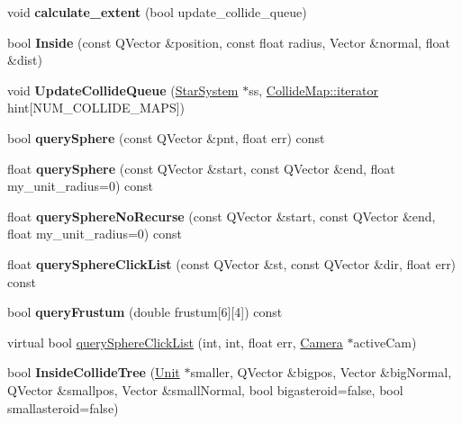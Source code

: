 \begin{DoxyCompactItemize}
\item 
void {\bfseries calculate\+\_\+extent} (bool update\+\_\+collide\+\_\+queue)\hypertarget{classUnit_ac7d13a538a0e97da9ec3c8e6926fdbcd}{}\label{classUnit_ac7d13a538a0e97da9ec3c8e6926fdbcd}

\item 
bool {\bfseries Inside} (const Q\+Vector \&position, const float radius, Vector \&normal, float \&dist)\hypertarget{classUnit_a30cc84a796e23fb5b35604edaa029533}{}\label{classUnit_a30cc84a796e23fb5b35604edaa029533}

\item 
void {\bfseries Update\+Collide\+Queue} (\hyperlink{classStarSystem}{Star\+System} $\ast$ss, \hyperlink{classCollidable}{Collide\+Map\+::iterator} hint\mbox{[}N\+U\+M\+\_\+\+C\+O\+L\+L\+I\+D\+E\+\_\+\+M\+A\+PS\mbox{]})\hypertarget{classUnit_a086271b6d4278f38a10c532a89952f9d}{}\label{classUnit_a086271b6d4278f38a10c532a89952f9d}

\item 
bool {\bfseries query\+Sphere} (const Q\+Vector \&pnt, float err) const \hypertarget{classUnit_a42f36e079132afd36eef45649deffb7b}{}\label{classUnit_a42f36e079132afd36eef45649deffb7b}

\item 
float {\bfseries query\+Sphere} (const Q\+Vector \&start, const Q\+Vector \&end, float my\+\_\+unit\+\_\+radius=0) const \hypertarget{classUnit_ab894fb92623a22ecc97a237e05419c72}{}\label{classUnit_ab894fb92623a22ecc97a237e05419c72}

\item 
float {\bfseries query\+Sphere\+No\+Recurse} (const Q\+Vector \&start, const Q\+Vector \&end, float my\+\_\+unit\+\_\+radius=0) const \hypertarget{classUnit_a16c6866b0beaca03cbdb8468a6469eff}{}\label{classUnit_a16c6866b0beaca03cbdb8468a6469eff}

\item 
float {\bfseries query\+Sphere\+Click\+List} (const Q\+Vector \&st, const Q\+Vector \&dir, float err) const \hypertarget{classUnit_a980436f43187fb76be5202ac37269fe4}{}\label{classUnit_a980436f43187fb76be5202ac37269fe4}

\item 
bool {\bfseries query\+Frustum} (double frustum\mbox{[}6\mbox{]}\mbox{[}4\mbox{]}) const \hypertarget{classUnit_a264aeb5e196471213b877f15d1cd227e}{}\label{classUnit_a264aeb5e196471213b877f15d1cd227e}

\item 
virtual bool \hyperlink{classUnit_a882081de69e4014803be5e955ce5e1e3}{query\+Sphere\+Click\+List} (int, int, float err, \hyperlink{classCamera}{Camera} $\ast$active\+Cam)
\item 
bool {\bfseries Inside\+Collide\+Tree} (\hyperlink{classUnit}{Unit} $\ast$smaller, Q\+Vector \&bigpos, Vector \&big\+Normal, Q\+Vector \&smallpos, Vector \&small\+Normal, bool bigasteroid=false, bool smallasteroid=false)\hypertarget{classUnit_a7b2a2ad957fe038882ac566046f309a8}{}\label{classUnit_a7b2a2ad957fe038882ac566046f309a8}


\end{DoxyCompactItemize}
